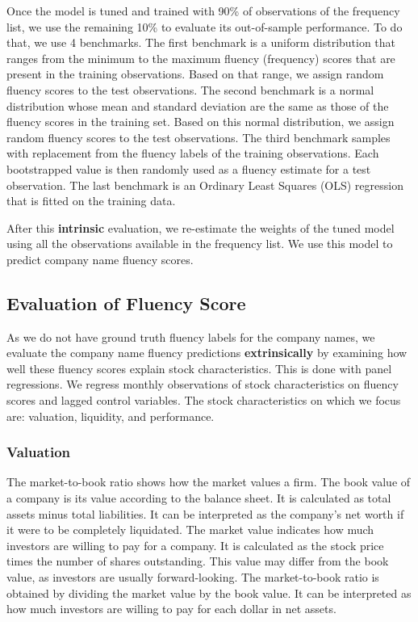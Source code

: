 \documentclass[11pt]{article}
\begin{document}
Once the model is tuned and trained with 90\% of observations of the frequency list, we use the remaining 10\% to evaluate its out-of-sample performance. To do that, we use 4 benchmarks. The first benchmark is a uniform distribution that ranges from the minimum to the maximum fluency (frequency) scores that are present in the training observations. Based on that range, we assign random fluency scores to the test observations. The second benchmark is a normal distribution whose mean and standard deviation are the same as those of the fluency scores in the training set. Based on this normal distribution, we assign random fluency scores to the test observations.
The third benchmark samples with replacement from the fluency labels of the training observations. Each bootstrapped value is then randomly used as a fluency estimate for a test observation. The last benchmark is an Ordinary Least Squares (OLS) regression that is fitted on the training data. 

After this \textbf{intrinsic} evaluation, we re-estimate the weights of the tuned model using all the observations available in the frequency list. We use this model to predict company name fluency scores. 













\subsection{Evaluation of Fluency Score}
As we do not have ground truth fluency labels for the company names, we evaluate the company name fluency predictions \textbf{extrinsically} by examining how well these fluency scores explain stock characteristics. This is done with panel regressions. We regress monthly observations of stock characteristics on fluency scores and lagged control variables. 
The stock characteristics on which we focus are: valuation, liquidity, and performance.

\subsubsection{Valuation}
The market-to-book ratio shows how the market values a firm. The book value of a company is its value according to the balance sheet. It is calculated as total assets minus total liabilities. It can be interpreted as the company's net worth if it were to be completely liquidated. The market value indicates how much investors are willing to pay for a company. It is calculated as the stock price times the number of shares outstanding. This value may differ from the book value, as investors are usually forward-looking. The market-to-book ratio is obtained by dividing the market value by the book value. It can be interpreted as how much investors are willing to pay for each dollar in net assets.
\end{document}
